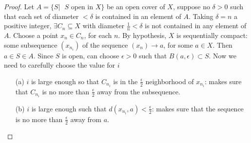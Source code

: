 \documentclass[article,11pt, reqno]{article}
\theoremstyle{remark}
\newcommand{\ra}{\rightarrow}
\newcommand{\<}{\langle}
\renewcommand{\>}{\rangle}
\newcommand{\ex}{\exists}
\begin{document}
\begin{proof}
    Let $A=\{S|\text{ $S$ open in $X$}\}$ be an open cover of $X$, suppose no $\delta>0$ such that each set of diameter $<\delta$ 
    is contained in an element of $A$. Taking $\delta=n$ a positive integer, $\ex C_n\subseteq X$ with diameter $\frac{1}{n}<\delta$ is not contained in any element of $A$. Choose a point $x_n\in C_n$, for each $n$. By hypothesis, $X$ is sequentially compact: some subsequence $(x_{n_i})$ of the sequence $(x_n)\ra a$, for some $a\in X$. Then $a\in S\in A$. Since $S$ is open, can choose $\epsilon>0$ such that $B(a,\epsilon)\subset S$. Now we need to carefully choose the value for $i$
    \begin{enumerate}
        \item[(a)] $i$ is large enough so that $C_{n_i}$ is in the $\frac{\epsilon}{2}$ neighborhood of $x_{n_i}$: makes sure that $C_{n_i}$ is no more than $\frac{\epsilon}{2}$ away from the subsequence.
        \item[(b)] $i$ is large enough such that $d(x_{n_i},a)<\frac{\epsilon}{2}$: makes sure that the sequence is no more than $\frac{\epsilon}{2}$ away from $a$.
    \end{enumerate}
    

\begin{tikzpicture}[x=0.75pt,y=0.75pt,yscale=-1,xscale=1]


\end{tikzpicture}
\end{proof}
\end{document}
